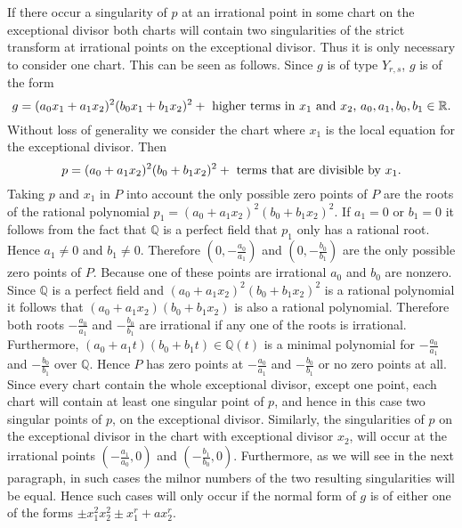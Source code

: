 \documentclass{amsproc}
\begin{document}
If there occur a singularity of $p$ at an irrational point in some chart on the exceptional divisor both charts will contain two singularities of the strict transform at irrational points on the exceptional divisor. Thus it is only necessary to consider one chart. This can be seen as follows. Since $g$ is of type $Y_{r,s}$, $g$ is of the form \[g=(a_0x_1+a_1x_2)^2(b_0x_1+b_1x_2)^2+\textnormal{ higher terms in $x_1$ and $x_2$, $a_0,a_1,b_0,b_1\in\mathbb R$.}\] Without loss of generality we consider the chart where $x_1$ is the local equation for the exceptional divisor. Then \[p=(a_0+a_1x_2)^2(b_0+b_1x_2)^2+\textnormal{ terms that are divisible by $x_1$.}\] Taking $p$ and $x_1$ in $P$ into account the only possible zero points of $P$ are the roots of the rational polynomial $p_1 = (a_0+a_1x_2)^2(b_0+b_1x_2)^2$. If $a_1=0$ or $b_1=0$ it follows from the fact that $\mathbb Q$ is a perfect field that $p_1$ only has a rational root. Hence $a_1\neq 0$ and $b_1\neq 0$. Therefore   $(0,-\frac{a_0}{a_1})$ and $(0,-\frac{b_0}{b_1})$ are the only possible zero points of $P$. Because one of these points are irrational $a_0$ and $b_0$ are nonzero. Since $\mathbb Q$ is a perfect field and $(a_0+a_1x_2)^2(b_0+b_1x_2)^2$ is  a rational polynomial it follows that $(a_0+a_1x_2)(b_0+b_1x_2)$ is also a rational polynomial. Therefore both roots $-\frac{a_0}{a_1}$ and $-\frac{b_0}{b_1}$ are irrational if any one of the roots is irrational. Furthermore, $(a_0+a_1t)(b_0+b_1t)\in\mathbb Q(t)$ is a minimal polynomial for $-\frac{a_0}{a_1}$ and $-\frac{b_0}{b_1}$ over $\mathbb Q$. Hence $P$ has zero points at $-\frac{a_0}{a_1}$ and $-\frac{b_0}{b_1}$ or no zero points at all. Since every chart contain the whole exceptional divisor, except one point, each chart will contain at least one singular point of $p$, and hence in this case two singular points of $p$, on the exceptional divisor. Similarly, the singularities of $p$ on the exceptional divisor in the chart with exceptional divisor $x_2$, will occur at the irrational points $(-\frac{a_1}{a_0},0)$ and $(-\frac{b_1}{b_0},0)$. Furthermore, as we will see in the next paragraph, in such cases the milnor numbers of the two resulting singularities will be equal. Hence such cases will only occur if the normal form of $g$ is of either one of the forms $\pm x_1^2x_2^2\pm x_1^r+ax_2^r$.
\end{document}
